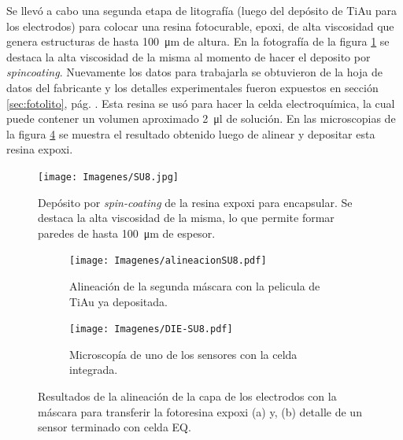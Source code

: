 { 		      Se llevó a cabo una segunda etapa de litografía (luego del depósito de Ti\textbar Au para los electrodos) para colocar una resina fotocurable, epoxi, de alta viscosidad que genera estructuras de hasta \SI{100}{\um} de altura. En la fotografía de la figura \ref{fig:su8} se destaca la alta viscosidad de la misma al momento de hacer el deposito por \textit{spincoating}. Nuevamente los datos para trabajarla se obtuvieron de la hoja de datos del fabricante\cite{Su8,Microchemicals2014} y los detalles experimentales fueron expuestos en  sección \ref{sec:fotolito}, pág. \pageref{sec:fotolito}. Esta resina se usó para hacer la celda electroquímica, la cual puede contener un volumen aproximado \SI{2}{\ul} de solución. En las microscopias de la figura \ref{fig:resultados-su8} se muestra el resultado obtenido luego de alinear y depositar esta resina expoxi.

 				\begin{figure}[h!]
 				\centering
 				\texttt{[image: Imagenes/SU8.jpg]}
 				\caption[Depósito de la resina expoxi SU8]{Depósito por \textit{spin-coating }de la resina expoxi para encapsular. Se destaca la alta viscosidad de la misma, lo que permite formar paredes de hasta \SI{100}{\um} de espesor.}
 				\label{fig:su8}
 				\end{figure}

 				\begin{figure}[bh!]
			 	   	    \centering
			 	   	    \begin{subfigure}[t]{0.495\textwidth}
			        	\texttt{[image: Imagenes/alineacionSU8.pdf]}
			       		\caption{Alineación de la segunda máscara con la pelicula de Ti\textbar Au ya depositada.}
			         	\label{fig:alineacion}
			     		\end{subfigure}
			     		\begin{subfigure}[t]{0.495\textwidth}
			     		\texttt{[image: Imagenes/DIE-SU8.pdf]}
			    		\caption{Microscopía de uno de los sensores con la celda integrada.}
			     		\label{fig:die-su8}	
						\end{subfigure}
						\caption[Alineación y celda integrada en SU8]{Resultados de la alineación de la capa de los electrodos con la máscara para transferir la fotoresina expoxi (a) y, (b) detalle de un sensor terminado con celda EQ.}
			     		\label{fig:resultados-su8}
			     	   	\end{figure}

}

